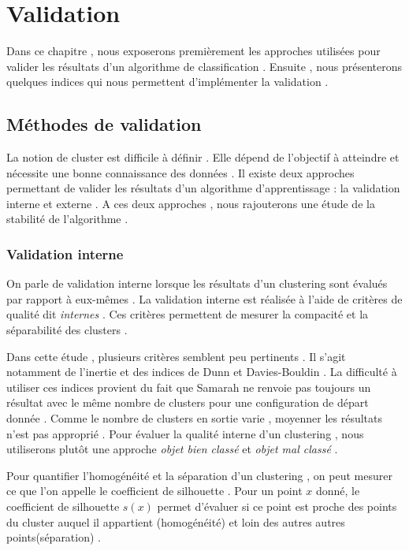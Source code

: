 \documentclass[11pt, openany]{report}
\begin{document}
\chapter{Validation}
Dans ce chapitre , nous exposerons premièrement les approches utilisées pour valider les résultats d’un algorithme de classification . Ensuite , nous présenterons  quelques  indices qui nous permettent d'implémenter la validation .  

\section{Méthodes de validation}
La notion de cluster est difficile à définir . Elle dépend de l’objectif à atteindre et nécessite une bonne connaissance des données .  Il existe deux approches permettant de valider les résultats d’un algorithme d’apprentissage : la validation interne et externe . A ces deux approches ,
nous rajouterons une étude de la stabilité de l'algorithme .
\subsection{Validation interne}
On parle de validation interne lorsque les résultats d’un clustering sont évalués par rapport à eux-mêmes . La validation interne est réalisée à l'aide de critères de qualité dit \emph{internes} . Ces critères permettent de mesurer la compacité et la séparabilité des clusters .

Dans cette étude , plusieurs critères semblent peu pertinents . Il s'agit notamment de l'inertie  et des indices de Dunn et Davies-Bouldin . La difficulté à utiliser ces indices provient du fait que Samarah ne renvoie pas toujours un résultat avec le même nombre de clusters pour une configuration de départ donnée . Comme le nombre de clusters en sortie varie , moyenner les résultats  n'est pas approprié . Pour évaluer la qualité interne d'un clustering , nous utiliserons plutôt une approche \emph{objet bien classé} et \emph{objet mal classé} .\par
Pour quantifier l'homogénéité et la séparation d'un clustering , on peut mesurer ce que l'on appelle le coefficient de silhouette . Pour un point $x$ donné, le coefficient de silhouette $s(x)$ permet d'évaluer  si ce point est proche des points  du cluster auquel il appartient (homogénéité)  et  loin des autres autres points(séparation) .
\newline
\newline
\newline
\newline
\end{document}
